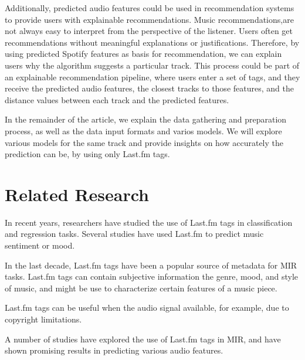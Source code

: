 \documentclass[sn-mathphys]{sn-jnl}%
\theoremstyle{thmstyleone}%
\theoremstyle{thmstyletwo}%
\theoremstyle{thmstylethree}%
\begin{document}
Additionally, predicted audio features could be used in recommendation systems to provide users with explainable recommendations.
Music recommendations,are not always easy to interpret from the perspective of the listener.
Users often get recommendations without meaningful explanations or justifications.
Therefore, by using predicted Spotify features as basis for recommendation, we can explain users why the algorithm suggests a particular track.
This process could be part of an explainable recommendation pipeline, where users enter a set of tags,
and they receive the predicted audio features, the closest tracks to those features, and the distance values between each track and the predicted features.


In the remainder of the article, we explain the data gathering and preparation process, as well as the data input formats and varios models.
We will explore various models for the same track and provide insights on how accurately the prediction can be, by using only Last.fm tags.

\section{Related Research}

In recent years, researchers have studied the use of Last.fm tags in classification and regression tasks.
Several studies have used Last.fm to predict music sentiment or mood.

In the last decade, Last.fm tags have been a popular source of metadata for MIR tasks.
Last.fm tags can contain subjective information the genre, mood, and style of music,
and might be use to characterize certain features of a music piece.


Last.fm tags can be useful when the audio signal available,
for example, due to copyright limitations.

A number of studies have explored the use of Last.fm tags in MIR,
and have shown promising results in predicting various audio features.
\end{document}
